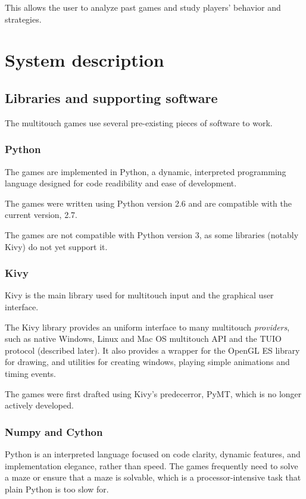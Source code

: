 \documentclass[a4paper,12pt]{article}
\begin{document}
This allows the user to analyze past games and study players' behavior and
strategies.

\section{System description}

\subsection{Libraries and supporting software}
\label{dependencies}

The multitouch games use several pre-existing pieces of software to work.

\subsubsection{Python}

The games are implemented in Python, a dynamic, interpreted programming
language designed for code readibility and ease of development.

The games were written using Python version 2.6 and are compatible with
the current version, 2.7.

The games are not compatible with Python version 3, as some libraries (notably
Kivy) do not yet support it.

\subsubsection{Kivy}

Kivy is the main library used for multitouch input and the graphical user
interface.

The Kivy library provides an uniform interface to many multitouch
\emph{providers}, such as native Windows, Linux and Mac OS multitouch API and
the TUIO protocol (described later).
It also provides a wrapper for the OpenGL ES library for drawing, and utilities
for creating windows, playing simple animations and timing events.

The games were first drafted using Kivy's predecerror, PyMT, which is
no longer actively developed.

\subsubsection{Numpy and Cython}


Python is an interpreted language focused on code clarity, dynamic features,
and implementation elegance, rather than speed.
The games frequently need to solve a maze or ensure that a maze is solvable,
which is a processor-intensive task that plain Python is too slow for.
\end{document}
